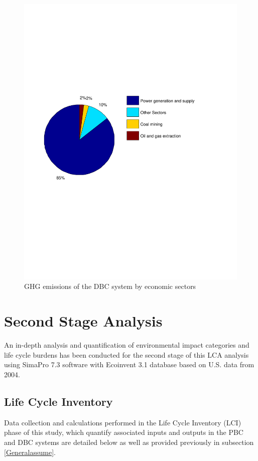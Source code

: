 \documentclass[3p,times,procedia]{elsarticle}
\begin{document}
\begin{figure}[t]
\includegraphics[width=\linewidth]{g.pdf}
\caption{GHG emissions of the DBC system by economic sectors}
\label{screecn4Sectors}
\endminipage\hfill
\end{figure}


\section{Second Stage Analysis}
An in-depth analysis and quantification of environmental impact categories and life cycle burdens has been conducted for the second stage of this LCA analysis using SimaPro 7.3 software with Ecoinvent 3.1 database based on U.S. data from 2004.

\subsection{Life Cycle Inventory}
Data collection and calculations performed in the Life Cycle Inventory (LCI) phase of this study, which quantify associated inputs and outputs in the PBC and DBC systems are detailed below as well as provided previously in subsection \ref{Generalassume}. 
\end{document}
